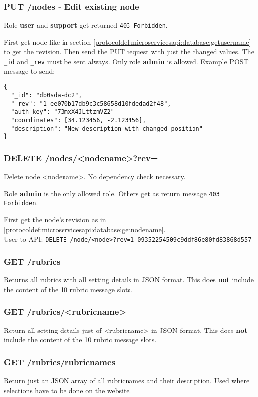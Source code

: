 \subsubsection{PUT /nodes - Edit existing node}
Role \textbf{user} and \textbf{support} get returned \verb|403 Forbidden|.

First get node like in section \ref{protocoldef:microservicesapi:database:getusername} to get the revision. Then send the PUT request with just the changed values. The \verb|_id| and \verb|_rev| must be sent always.
Only role \textbf{admin} is allowed.
Example POST message to send:

\begin{lstlisting}
{
  "_id": "db0sda-dc2",
  "_rev": "1-ee070b17db9c3c58658d10fdedad2f48",
  "auth_key": "73mxX4JLttzmVZ2"
  "coordinates": [34.123456, -2.123456],
  "description": "New description with changed position"
}
\end{lstlisting}

\subsubsection{DELETE /nodes/<nodename>?rev=}
Delete node <nodename>. No dependency check necessary.

Role \textbf{admin} is the only allowed role. Others get as return message \verb|403 Forbidden|.

First get the node's revision as in \ref{protocoldef:microservicesapi:database:getnodename}.\\
User to API: \verb|DELETE /node/<node>?rev=1-09352254509c9ddf86e80fd83868d557|


\subsubsection{GET /rubrics}
Returns all rubrics with all setting details in JSON format. This does \textbf{not} include the content of the 10 rubric message slots.

\subsubsection{GET /rubrics/<rubricname>}
Return all setting details just of <rubricname> in JSON format. This does \textbf{not} include the content of the 10 rubric message slots.

\subsubsection{GET /rubrics/rubricnames}
Return just an JSON array of all rubricnames and their description. Used where selections have to be done on the website.

